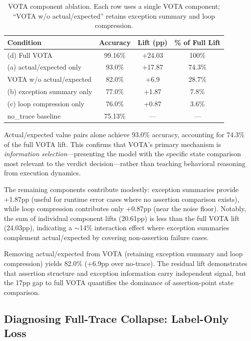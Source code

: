 \documentclass[11pt]{article}
\begin{document}
\begin{table}[h]
\centering
\caption{VOTA component ablation. Each row uses a single VOTA component; ``VOTA w/o actual/expected'' retains exception summary and loop compression.}
\label{tab:component}
\begin{tabular}{lccc}
\toprule
\textbf{Condition} & \textbf{Accuracy} & \textbf{Lift (pp)} & \textbf{\% of Full Lift} \\
\midrule
(d) Full VOTA               & 99.16\% & +24.03 & 100\%  \\
(a) actual/expected only     & 93.0\%  & +17.87 & 74.3\% \\
VOTA w/o actual/expected     & 82.0\%  & +6.9   & 28.7\% \\
(b) exception summary only   & 77.0\%  & +1.87  & 7.8\%  \\
(c) loop compression only    & 76.0\%  & +0.87  & 3.6\%  \\
\midrule
no\_trace baseline           & 75.13\% & ---    & ---    \\
\bottomrule
\end{tabular}
\end{table}

Actual/expected value pairs alone achieve 93.0\% accuracy, accounting for 74.3\% of the full VOTA lift. This confirms that VOTA's primary mechanism is \emph{information selection}---presenting the model with the specific state comparison most relevant to the verdict decision---rather than teaching behavioral reasoning from execution dynamics.

The remaining components contribute modestly: exception summaries provide +1.87pp (useful for runtime error cases where no assertion comparison exists), while loop compression contributes only +0.87pp (near the noise floor). Notably, the sum of individual component lifts (20.61pp) is less than the full VOTA lift (24.03pp), indicating a $\sim$14\% interaction effect where exception summaries complement actual/expected by covering non-assertion failure cases.

Removing actual/expected from VOTA (retaining exception summary and loop compression) yields 82.0\% (+6.9pp over no-trace). The residual lift demonstrates that assertion structure and exception information carry independent signal, but the 17pp gap to full VOTA quantifies the dominance of assertion-point state comparison.

\subsection{Diagnosing Full-Trace Collapse: Label-Only Loss}
\label{sec:labelonly}
\end{document}
